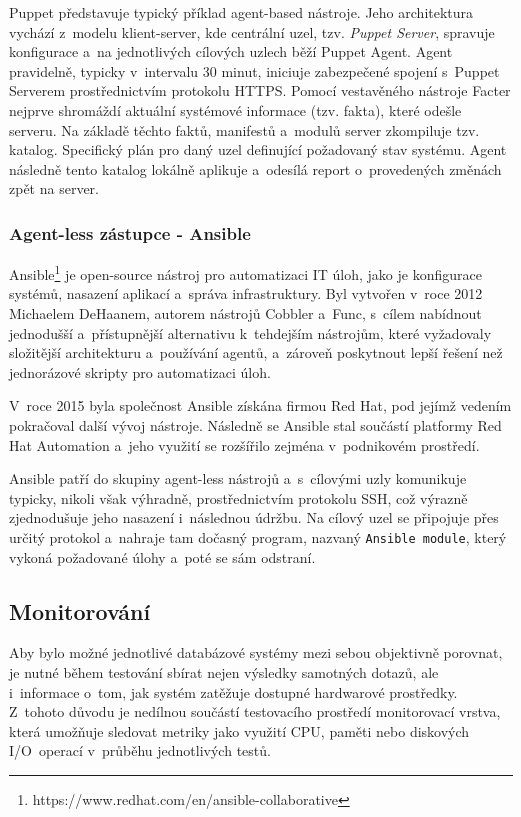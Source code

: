 Puppet představuje typický příklad agent-based nástroje. Jeho architektura vychází z~modelu klient-server, kde centrální uzel, tzv. \textit{Puppet Server}, spravuje konfigurace a~na jednotlivých cílových uzlech běží Puppet Agent. 
Agent pravidelně, typicky v~intervalu 30 minut, iniciuje zabezpečené spojení s~Puppet Serverem prostřednictvím protokolu HTTPS. 
Pomocí vestavěného nástroje Facter nejprve shromáždí aktuální systémové informace (tzv. fakta), které odešle serveru. 
Na základě těchto faktů, manifestů a~modulů server zkompiluje tzv. katalog. 
Specifický plán pro daný uzel definující požadovaný stav systému. 
Agent následně tento katalog lokálně aplikuje a~odesílá report o~provedených změnách zpět na server. 
\cite{puppetdocs}

\subsubsection{Agent-less zástupce - Ansible}
Ansible\footnote{https://www.redhat.com/en/ansible-collaborative} je open-source nástroj pro automatizaci IT úloh, jako je konfigurace systémů, nasazení aplikací a~správa infrastruktury. 
Byl vytvořen v~roce 2012 Michaelem DeHaanem, autorem nástrojů Cobbler a~Func, s~cílem nabídnout jednodušší a~přístupnější alternativu k~tehdejším nástrojům, které vyžadovaly složitější architekturu a~používání agentů, a~zároveň poskytnout lepší řešení než jednorázové skripty pro automatizaci úloh. 

V~roce 2015 byla společnost Ansible získána firmou Red Hat, pod jejímž vedením pokračoval další vývoj nástroje. Následně se Ansible stal součástí platformy Red Hat Automation a~jeho využití se rozšířilo zejména v~podnikovém prostředí. \cite{hochstein2017ansible}

Ansible patří do skupiny agent-less nástrojů a~s~cílovými uzly komunikuje typicky, nikoli však výhradně, prostřednictvím protokolu SSH, což výrazně zjednodušuje jeho nasazení i~následnou údržbu. 
Na cílový uzel se připojuje přes určitý protokol a~nahraje tam dočasný program, nazvaný \texttt{Ansible module}, který vykoná požadované úlohy a~poté se sám odstraní.
\cite{hochstein2017ansible}
\clearpage
\subsection{Monitorování}
Aby bylo možné jednotlivé databázové systémy mezi sebou objektivně porovnat, je nutné během testování sbírat nejen výsledky samotných dotazů, ale i~informace o~tom, jak systém zatěžuje dostupné hardwarové prostředky. 
Z~tohoto důvodu je nedílnou součástí testovacího prostředí monitorovací vrstva, která umožňuje sledovat metriky jako využití CPU, paměti nebo diskových I/O~operací v~průběhu jednotlivých testů.

